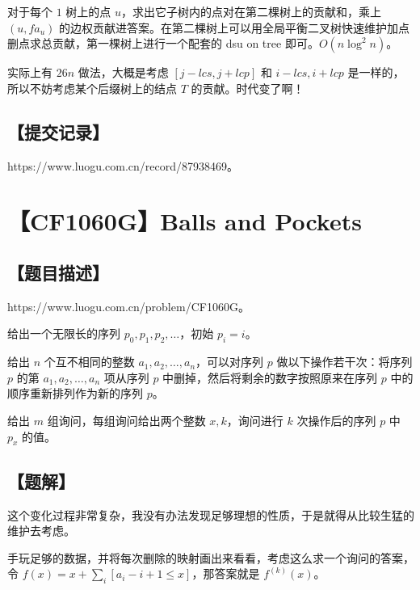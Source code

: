 \documentclass[UTF8,12pt,a4paper]{ctexart}
\begin{document}
	对于每个 $1$ 树上的点 $u$，求出它子树内的点对在第二棵树上的贡献和，乘上 $(u,fa_u)$ 的边权贡献进答案。在第二棵树上可以用全局平衡二叉树快速维护加点删点求总贡献，第一棵树上进行一个配套的 dsu on tree 即可。$O(n\log^2n)$。
	
	实际上有 $26n$ 做法，大概是考虑 $[j-lcs,j+lcp]$ 和 $i-lcs,i+lcp$ 是一样的，所以不妨考虑某个后缀树上的结点 $T$ 的贡献。时代变了啊！
	
	\subsection*{【提交记录】}
	
	https://www.luogu.com.cn/record/87938469。
	
	
	\section*{【CF1060G】Balls and Pockets}
	
	\subsection*{【题目描述】}
	
	https://www.luogu.com.cn/problem/CF1060G。
	
	给出一个无限长的序列 $p_0,p_1,p_2,\ldots$，初始 $p_i=i$。
	
	给出 $n$ 个互不相同的整数 $a_1,a_2,\ldots,a_n$，可以对序列 $p$ 做以下操作若干次：将序列 $p$ 的第 $a_1,a_2,\ldots,a_n$ 项从序列 $p$ 中删掉，然后将剩余的数字按照原来在序列 $p$ 中的顺序重新排列作为新的序列 $p$。
	
	给出 $m$ 组询问，每组询问给出两个整数 $x,k$，询问进行 $k$ 次操作后的序列 $p$ 中 $p_x$ 的值。
	
	\subsection*{【题解】}
	
	这个变化过程非常复杂，我没有办法发现足够理想的性质，于是就得从比较生猛的维护去考虑。
	
	手玩足够的数据，并将每次删除的映射画出来看看，考虑这么求一个询问的答案，令 $f(x)=x+\sum_{i}[a_i-i+1\le x]$，那答案就是 $f^{(k)}(x)$。
	
\end{document}
